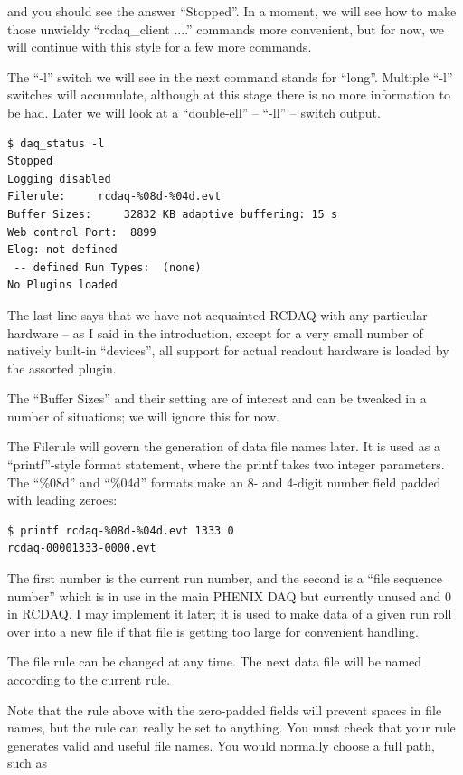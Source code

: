 \documentclass{article}[11pt]
\begin{document}
and you should see the answer ``Stopped''. In a moment, we will see
how to make those unwieldy ``rcdaq\_client ....'' commands more
convenient, but for now, we will continue with this style for a few
more commands.

The ``-l'' switch we will see in the next command stands for
``long''. Multiple ``-l'' switches will accumulate, although 
at this stage there is no more information to be had. Later we will look
at a ``double-ell'' -- ``-ll'' -- switch output.  

\begin{verbatim}
$ daq_status -l
Stopped
Logging disabled
Filerule:     rcdaq-%08d-%04d.evt
Buffer Sizes:     32832 KB adaptive buffering: 15 s
Web control Port:  8899
Elog: not defined
 -- defined Run Types:  (none)
No Plugins loaded
\end{verbatim}

The last line says that we have not acquainted RCDAQ with any particular
hardware -- as I said in the introduction, except for a very small
number of natively built-in ``devices'', all support for actual
readout hardware is loaded by the assorted plugin.

The ``Buffer Sizes'' and their setting are of interest and can be
tweaked in a number of situations; we will ignore this for now.

The Filerule will govern the generation of data file names later. It
is used as a ``printf''-style format statement, where the printf takes
two integer parameters. The ``\%08d'' and ``\%04d'' formats make an 8-
and 4-digit number field padded with leading zeroes:

\begin{verbatim}
$ printf rcdaq-%08d-%04d.evt 1333 0 
rcdaq-00001333-0000.evt
\end{verbatim}

The first number is the current run number, and the second is a ``file
sequence number'' which is in use in the main PHENIX DAQ but currently
unused and 0 in RCDAQ. I may implement it later; it is used to make
data of a given run roll over into a new file if that file is getting
too large for convenient handling. 

The file rule can be changed at any time. The next data file will be
named according to the current rule.

Note that the rule above with the zero-padded fields will prevent
spaces in file names, but the rule can really be set to anything. You
must check that your rule generates valid and useful file names. You
would normally choose a full path, such as
\end{document}
